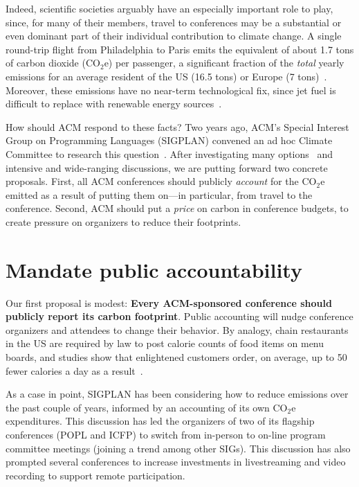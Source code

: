 \documentclass[12pt]{article}
\newcommand{\bcp}[1]{\ifdraft{\bf [bcp: #1]}\fi}
\newcommand{\COtwoE}{CO$_2$e}
\newcommand{\SECTION}{\section*}
\begin{document}
Indeed, scientific societies arguably have an especially important role to
play, since, for many of their members, travel to conferences may be a
substantial or even dominant part of their individual contribution to
climate change.  A single round-trip flight from Philadelphia to Paris emits
the equivalent of about 1.7 tons of carbon dioxide (\COtwoE) per
passenger\iflater\bcp{Citation?}\fi, a significant fraction of the
{\em total} yearly emissions for an average resident of the US (16.5 tons)
or Europe (7 tons)~\cite{emissions}.  
Moreover, these emissions have no near-term technological
fix, since jet fuel is difficult to replace with renewable energy
sources~\cite{elec-air}.

How should ACM respond to these facts?  Two years ago, ACM's Special
Interest Group on Programming Languages (SIGPLAN) convened an ad hoc Climate
Committee to research this question~\cite{ClimateCommittee}.  After
investigating many options~\cite{ClimateCommitteReport} and intensive and
wide-ranging discussions, we are putting forward two concrete
proposals. First, all ACM 
conferences should publicly {\em account} for the {\COtwoE} emitted as a
result of putting them on---in particular, from travel to
the conference. Second, ACM should put a \emph{price} on 
carbon in conference budgets, to create pressure on organizers to reduce
their footprints.

\SECTION{Mandate public accountability} 

Our first proposal is modest: {\bf Every ACM-sponsored conference should
publicly report its carbon footprint}.  
%
Public accounting will nudge conference organizers and attendees to change
their behavior. By analogy, chain restaurants in the US are required by law
to post calorie counts of food items on menu boards, and studies show that
enlightened customers order, on average, up to 50 fewer calories a day as a
result~\cite{menu}.  

As a case in point, SIGPLAN has been considering how to reduce emissions
over the past couple of years, informed by an accounting of its own
{\COtwoE} expenditures. This discussion has led the organizers of two of its
flagship conferences (POPL and ICFP) to switch from in-person to on-line
program committee meetings (joining a trend among other SIGs). This
discussion has also prompted several conferences to increase investments in
livestreaming and video recording to support remote participation.
\end{document}
